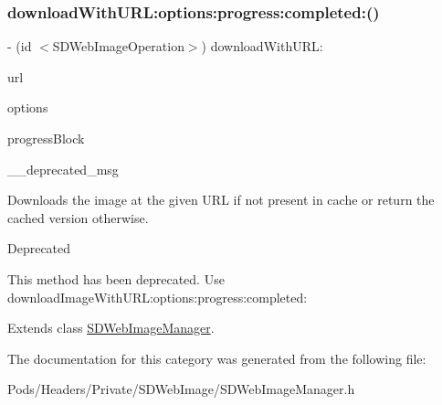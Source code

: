 \subsubsection{\texorpdfstring{download\+With\+U\+R\+L\+:options\+:progress\+:completed\+:()}{downloadWithURL:options:progress:completed:()}\hspace{0.1cm}{\footnotesize\ttfamily [3/3]}}
{\footnotesize\ttfamily -\/ (id $<$S\+D\+Web\+Image\+Operation$>$) download\+With\+U\+R\+L\+: \begin{DoxyParamCaption}\item[{(N\+S\+U\+RL $\ast$)}]{url }\item[{options:(S\+D\+Web\+Image\+Options)}]{options }\item[{progress:(S\+D\+Web\+Image\+Downloader\+Progress\+Block)}]{progress\+Block }\item[{completed:(\char`\"{}Method deprecated. Use \`{}download\+Image\+With\+U\+R\+L\+:options\+:progress\+:completed\+:\`{}\char`\"{})}]{\+\_\+\+\_\+deprecated\+\_\+msg }\end{DoxyParamCaption}}

Downloads the image at the given U\+RL if not present in cache or return the cached version otherwise.

\begin{DoxyRefDesc}{Deprecated}
\item[\mbox{\hyperlink{deprecated__deprecated000032}{Deprecated}}]This method has been deprecated. Use {\ttfamily download\+Image\+With\+U\+R\+L\+:options\+:progress\+:completed\+:} \end{DoxyRefDesc}


Extends class \mbox{\hyperlink{interface_s_d_web_image_manager_a6ed93377fa34b44c02bce84279529dad}{S\+D\+Web\+Image\+Manager}}.



The documentation for this category was generated from the following file\+:\begin{DoxyCompactItemize}
\item 
Pods/\+Headers/\+Private/\+S\+D\+Web\+Image/S\+D\+Web\+Image\+Manager.\+h\end{DoxyCompactItemize}
